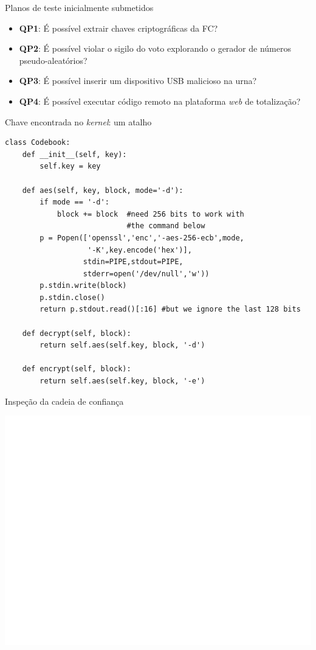 \documentclass[10pt,xcolor={dvipsnames}]{beamer}
\begin{document}
\begin{frame}{Planos de teste inicialmente submetidos}
  \begin{itemize}
    \item \textbf{QP1}: É possível extrair chaves criptográficas da FC?
    \item \textbf{QP2}: É possível violar o sigilo do voto explorando o gerador de números
pseudo-aleatórios?
    \item \textbf{QP3}: É possível inserir um dispositivo USB malicioso na urna?
    \item \textbf{QP4}: É possível executar código remoto na plataforma \textit{web} de totalização?
  \end{itemize}
\end{frame}


\begin{frame}[fragile]{Chave encontrada no \textit{kernel}: um atalho}
\begin{verbatim}
class Codebook:
    def __init__(self, key):
        self.key = key

    def aes(self, key, block, mode='-d'):
        if mode == '-d':
            block += block  #need 256 bits to work with
                            #the command below
        p = Popen(['openssl','enc','-aes-256-ecb',mode,
                   '-K',key.encode('hex')],
                  stdin=PIPE,stdout=PIPE,
                  stderr=open('/dev/null','w'))
        p.stdin.write(block)
        p.stdin.close()
        return p.stdout.read()[:16] #but we ignore the last 128 bits

    def decrypt(self, block):
        return self.aes(self.key, block, '-d')

    def encrypt(self, block):
        return self.aes(self.key, block, '-e')
\end{verbatim}
\end{frame}


\begin{frame}{Inspeção da cadeia de confiança}
\begin{center}
\includegraphics[width=\textwidth,height=0.5\textheight,keepaspectratio]{assinaturas_sistema.pdf}
\end{center}
\end{frame}
\end{document}
